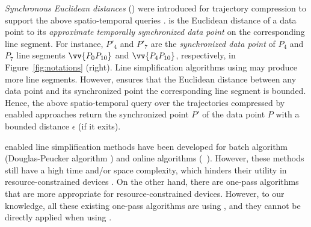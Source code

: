 

\emph{Synchronous Euclidean distances} (\sed) were introduced for trajectory compression to support the above spatio-temporal queries \cite{Meratnia:Spatiotemporal}. \sed is the Euclidean distance of a data point to its \emph{approximate temporally synchronized data point \cite{Meratnia:Spatiotemporal}} on the corresponding line segment. For instance, $P'_4$ and $P'_7$ are the \emph{synchronized data point} of $P_4$ and $P_7$ \wrt line segments $\vv{P_0P_{10}}$ and $\vv{P_4P_{10}}$, respectively, in Figure~\ref{fig:notations} (right).
Line simplification algorithms using \sed may produce more line segments. However, \sed ensures that the Euclidean distance between any data point  and its  synchronized point \wrt the corresponding line segment is bounded. Hence, the above spatio-temporal query over the trajectories compressed by \sed enabled approaches return the synchronized point $P'$ of the data point $P$ with a bounded distance $\epsilon$  (if it exits).

\sed enabled line simplification methods have been developed for batch algorithm (\eg Douglas-Peucker algorithm \cite{Meratnia:Spatiotemporal}) and online algorithms (\eg\ \squishe \cite{Muckell:Compression}).
However, these methods still have a high time and/or space complexity, which hinders their utility in resource-constrained devices \cite{Lin:Operb}.
On the other hand, there are one-pass algorithms \cite{Williams:Longest, Sklansky:Cone, Dunham:Cone, Zhao:Sleeve, Lin:Operb}  that are more appropriate for resource-constrained devices.  However, to our knowledge, all these existing one-pass algorithms are using \ped, and they cannot be directly applied when using \sed.



